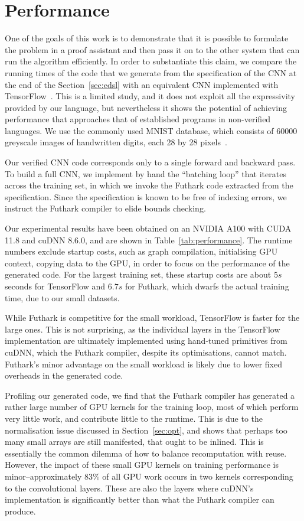 \section{Performance\label{sec:performance}}

One of the goals of this work is to demonstrate that it is possible to
formulate the problem in a proof assistant and then pass it on to the
other system that can run the algorithm efficiently. In order to
substantiate this claim, we compare the running times of the code that
we generate from the specification of the CNN at the end of the
Section~\ref{sec:edsl} with an equivalent CNN implemented with
TensorFlow~\cite{ad-tf}. This is a limited study, and it does not
exploit all the expressivity provided by our language, but
nevertheless it shows the potential of achieving performance that
approaches that of established programs in non-verified languages. We
use the commonly used MNIST database, which consists of 60000
greyscale images of handwritten digits, each 28 by 28
pixels~\cite{deng2012mnist}.

Our verified CNN code corresponds only to a single forward and
backward pass. To build a full CNN, we implement by hand the
``batching loop'' that iterates across the training set, in which we
invoke the Futhark code extracted from the specification. Since the
specification is known to be free of indexing errors, we instruct the
Futhark compiler to elide bounds checking.

Our experimental results have been obtained on an NVIDIA A100 with
CUDA 11.8 and cuDNN 8.6.0, and are shown in
Table~\ref{tab:performance}. The runtime numbers exclude startup
costs, such as graph compilation, initialising GPU context, copying
data to the GPU, in order to focus on the performance of the generated
code. For the largest training set, these startup costs are about $5s$
seconds for TensorFlow and $6.7s$ for Futhark, which dwarfs the actual
training time, due to our small datasets.

While Futhark is competitive for the small workload, TensorFlow is
faster for the large ones. This is not surprising, as the individual
layers in the TensorFlow implementation are ultimately implemented
using hand-tuned primitives from cuDNN, which the Futhark compiler,
despite its optimisations, cannot match. Futhark's minor advantage on
the small workload is likely due to lower fixed overheads in the
generated code.

Profiling our generated code, we find that the Futhark compiler has
generated a rather large number of GPU kernels for the training loop,
most of which perform very little work, and contribute little to the
runtime. This is due to the normalisation issue discussed in
Section~\ref{sec:opt}, and shows that perhaps too many small arrays
are still manifested, that ought to be inlined. This is essentially
the common dilemma of how to balance recomputation with reuse.
However, the impact of these small GPU kernels on training performance
is minor--approximately 83\% of all GPU work occurs in two kernels
corresponding to the convolutional layers. These are also the layers
where cuDNN's implementation is significantly better than what the
Futhark compiler can produce.

